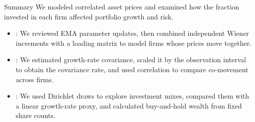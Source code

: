 \documentclass[aspectratio=169,11pt]{beamer}
\begin{document}
\begin{frame}{Summary}
  We modeled correlated asset prices and examined how the fraction invested
  in each firm affected portfolio growth and risk.

  \vspace{0.5em}
  {\large\textbf{}}
  \vspace{0.3em}
  \begin{itemize}\setlength{\itemsep}{0.4em}
    \item {}: We reviewed EMA parameter updates,
      then combined independent Wiener increments with a loading matrix to model firms whose prices move together.
    \item {}: We estimated growth-rate covariance,
      scaled it by the observation interval to obtain the covariance rate,
      and used correlation to compare co-movement across firms.
    \item {}: We used Dirichlet draws to explore
      investment mixes, compared them with a linear growth-rate proxy, and
      calculated buy-and-hold wealth from fixed share counts.
  \end{itemize}
\end{frame}

\end{document}
